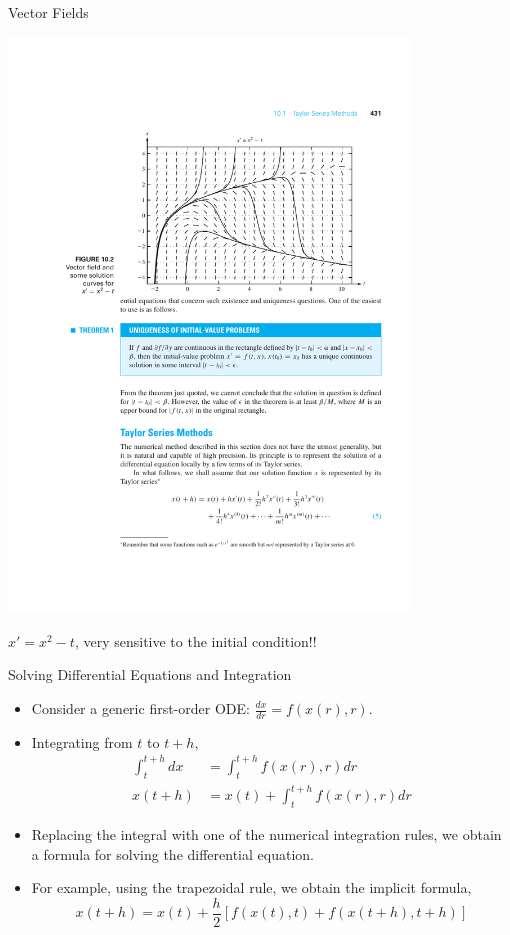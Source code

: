 \documentclass{beamer}
\newcommand{\beforeverb}{\footnotesize}
\newcommand{\afterverb}{\normalsize}
\begin{document}
\begin{frame}{Vector Fields}
\centerline{\includegraphics[width=0.8\textwidth]{Lec13_fig2}}
\begin{center}
$x'=x^2-t$, very sensitive to the initial condition!!
\end{center}
\end{frame}

\begin{frame}{Solving Differential Equations and Integration}
\begin{itemize}
\item Consider a generic first-order ODE:
$\frac{dx}{dr}=f(x(r),r)$. 
\item Integrating from $t$ to $t+h$, 
\beforeverb
\begin{align*}
\int_t^{t+h} dx&=\int_t^{t+h} f(x(r),r) dr\\
x(t+h)&=x(t)+\int_t^{t+h} f(x(r),r) dr
\end{align*}
\afterverb

\item Replacing the integral with one of the numerical integration rules, we obtain a formula for solving the differential equation.
\item For example, using the trapezoidal rule, we obtain the \alert{implicit formula},
\beforeverb
\[
x(t+h)=x(t)+\frac{h}{2}\left[f(x(t),t)+f(x(t+h), t+h)\right]
\]
\afterverb
\end{itemize}
\end{frame}
\end{document}
